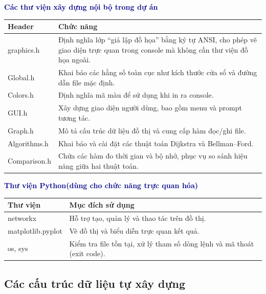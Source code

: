\documentclass[14pt,a4paper]{report}
\begin{document}
\vspace{0.8em}
\textbf{\textcolor{darkblue}{Các thư viện xây dựng nội bộ trong dự án}} \\
\vspace{5pt}
\renewcommand{\arraystretch}{1.2}
\begin{tabularx}{\linewidth}{|>{\ttfamily}l|X|}
\hline
\textnormal{\textbf{Header}} & \textbf{Chức năng} \\ \hline
graphics.h   & Định nghĩa lớp ``giả lập đồ họa'' bằng ký tự ANSI, cho phép vẽ giao diện trực quan trong console mà không cần thư viện đồ họa ngoài. \\ \hline
Global.h     & Khai báo các hằng số toàn cục như kích thước cửa sổ và đường dẫn file mặc định. \\ \hline
Colors.h     & Định nghĩa mã màu để sử dụng khi in ra console. \\ \hline
GUI.h        & Xây dựng giao diện người dùng, bao gồm menu và prompt tương tác. \\ \hline
Graph.h      & Mô tả cấu trúc dữ liệu đồ thị và cung cấp hàm đọc/ghi file. \\ \hline
Algorithms.h & Khai báo và cài đặt các thuật toán Dijkstra và Bellman--Ford. \\ \hline
Comparison.h & Chứa các hàm đo thời gian và bộ nhớ, phục vụ so sánh hiệu năng giữa hai thuật toán. \\ \hline
\end{tabularx}

\vspace{0.8em}
\textbf{\textcolor{darkblue}{Thư viện Python(dùng cho chức năng trực quan hóa)}} \\
\renewcommand{\arraystretch}{1.2}
\begin{tabularx}{\linewidth}{|>{\ttfamily}l|X|}
\hline
\textnormal{\textbf{Thư viện}} & \textbf{Mục đích sử dụng} \\ \hline
networkx           & Hỗ trợ tạo, quản lý và thao tác trên đồ thị. \\ \hline
matplotlib.pyplot  & Vẽ đồ thị và biểu diễn trực quan kết quả. \\ \hline
os, sys            & Kiểm tra file tồn tại, xử lý tham số dòng lệnh và mã thoát (exit code). \\ \hline
\end{tabularx}

\subsection{Các cấu trúc dữ liệu tự xây dựng}
\end{document}
